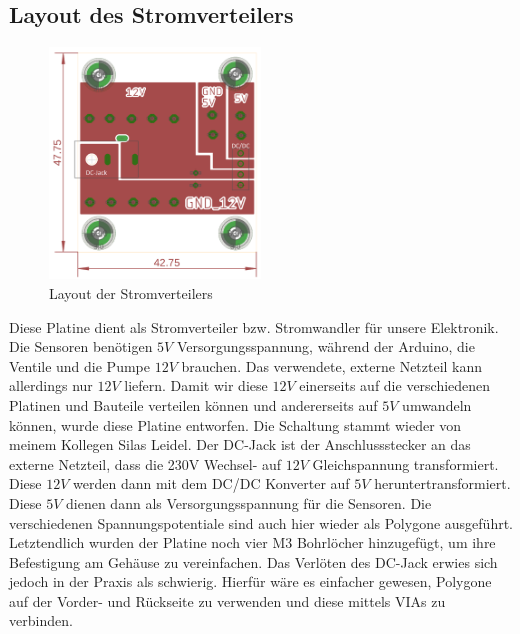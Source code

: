 \subsection{Layout des Stromverteilers} \label{stromlayout}
\begin{figure}[h]
    \centering
    \includegraphics[width=0.5\textwidth]{dennis/layout}
    \caption{Layout der Stromverteilers}
\end{figure}
Diese Platine dient als Stromverteiler bzw. Stromwandler für unsere Elektronik. Die Sensoren
benötigen $5V$ Versorgungsspannung, während der Arduino, die Ventile und die Pumpe $12V$
brauchen. Das verwendete, externe Netzteil kann allerdings nur $12V$ liefern. Damit wir diese
$12V$ einerseits auf die verschiedenen Platinen und Bauteile verteilen können und
andererseits auf $5V$ umwandeln können, wurde diese Platine entworfen. Die Schaltung
stammt wieder von meinem Kollegen Silas Leidel. Der DC-Jack ist der Anschlussstecker an
das externe Netzteil, dass die 230V Wechsel- auf $12V$ Gleichspannung transformiert. Diese
$12V$ werden dann mit dem DC/DC Konverter auf $5V$ heruntertransformiert. Diese $5V$ dienen
dann als Versorgungsspannung für die Sensoren. Die verschiedenen Spannungspotentiale
sind auch hier wieder als Polygone ausgeführt. Letztendlich wurden der Platine noch vier M3
Bohrlöcher hinzugefügt, um ihre Befestigung am Gehäuse zu vereinfachen. Das Verlöten des
DC-Jack erwies sich jedoch in der Praxis als schwierig. Hierfür wäre es einfacher gewesen,
Polygone auf der Vorder- und Rückseite zu verwenden und diese mittels VIAs zu verbinden.
